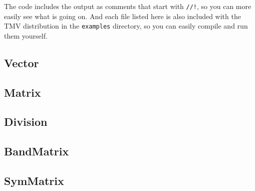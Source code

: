 \documentclass[twoside,letterpaper,11pt]{article}
\newcommand{\inputcode}[1]{}
\begin{document}
The code includes the output as comments that start with \lstinline{//!}, so you can more easily see what is going on.
And each file listed here is also included with the TMV distribution in the \texttt{examples}
directory, so you can easily compile and run them yourself.

\subsection{Vector}

\inputcode{../examples/Vector.cpp}
%
%
\vspace{12pt}

\subsection{Matrix}

\inputcode{../examples/Matrix.cpp}
%
%
\vspace{12pt}

\subsection{Division}

\inputcode{../examples/Division.cpp}
%
%
\vspace{12pt}

\subsection{BandMatrix}

\inputcode{../examples/BandMatrix.cpp}
%
%
\vspace{12pt}

\subsection{SymMatrix}

\inputcode{../examples/SymMatrix.cpp}
%
%

\end{document}
